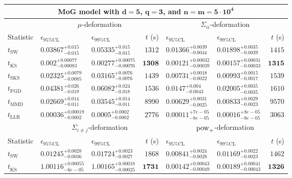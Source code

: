 \begin{tabular}{l|llr|llr}
	\toprule
	\multicolumn{7}{c}{{\bf MoG model with $\mathbf{d=5}$, $\mathbf{q=3}$, and $\mathbf{n=m=5\cdot 10^{4}}$}} \\
	\toprule
	\multicolumn{1}{c}{} & \multicolumn{3}{c}{$\mu$-deformation} & \multicolumn{3}{c}{$\Sigma_{ii}$-deformation} \\
	Statistic & $\epsilon_{95\%\mathrm{CL}}$ & $\epsilon_{99\%\mathrm{CL}}$ & $t$ (s) & $\epsilon_{95\%\mathrm{CL}}$ & $\epsilon_{99\%\mathrm{CL}}$ & $t$ (s) \\
	\midrule
	$t_{\mathrm{SW}}$ & $0.03867_{-0.015}^{+0.015}$ & $0.05335_{-0.015}^{+0.015}$ & $1312$ & $0.01366_{-0.0044}^{+0.0039}$ & $0.01898_{-0.0039}^{+0.0035}$ & $1415$ \\
	$t_{\overline{\mathrm{KS}}}$ & ${\mathbf{0.002_{-0.00083}^{+0.00077}}}$ & ${\mathbf{0.00277_{-0.00076}^{+0.00075}}}$ & ${\mathbf{1308}}$ & ${\mathbf{0.00121_{-0.00039}^{+0.00032}}}$ & ${\mathbf{0.00157_{-0.00033}^{+0.00031}}}$ & ${\mathbf{1315}}$ \\
	$t_{\mathrm{SKS}}$ & $0.02325_{-0.0085}^{+0.0079}$ & $0.03165_{-0.0076}^{+0.0076}$ & $1439$ & $0.00731_{-0.0022}^{+0.0018}$ & $0.00993_{-0.0017}^{+0.0015}$ & $1539$ \\
	$t_{\mathrm{FGD}}$ & $0.04381_{-0.019}^{+0.026}$ & $0.06082_{-0.018}^{+0.024}$ & $1536$ & $0.0147_{-0.0043}^{+0.004}$ & $0.02005_{-0.0035}^{+0.0035}$ & $1610$ \\
	$t_{\mathrm{MMD}}$ & $0.02669_{-0.011}^{+0.014}$ & $0.03545_{-0.011}^{+0.014}$ & $8990$ & $0.00629_{-0.0025}^{+0.0031}$ & $0.00833_{-0.0023}^{+0.0029}$ & $9570$ \\
	$t_{\mathrm{LLR}}$ & $0.00036_{-0.0002}^{+0.00019}$ & $0.0005_{-0.0002}^{+0.0002}$ & $2776$ & $0.00011_{-8e-05}^{+7e-05}$ & $0.00016_{-8e-05}^{+8e-05}$ & $3063$ \\
	\toprule
	\multicolumn{1}{c}{} & \multicolumn{3}{c}{$\Sigma_{i\neq j}$-deformation} & \multicolumn{3}{c}{$\rm{pow}_{+}$-deformation} \\
	Statistic & $\epsilon_{95\%\mathrm{CL}}$ & $\epsilon_{99\%\mathrm{CL}}$ & $t$ (s) & $\epsilon_{95\%\mathrm{CL}}$ & $\epsilon_{99\%\mathrm{CL}}$ & $t$ (s) \\
	\midrule
	$t_{\mathrm{SW}}$ & $0.01245_{-0.0036}^{+0.0028}$ & $0.01724_{-0.0027}^{+0.0023}$ & $1868$ & $0.00841_{-0.0028}^{+0.0024}$ & $0.01169_{-0.0023}^{+0.0022}$ & $1462$ \\
	$t_{\overline{\mathrm{KS}}}$ & $1.00116_{-6e-05}^{+0.00055}$ & $1.00165_{-0.00025}^{+0.00018}$ & ${\mathbf{1731}}$ & ${\mathbf{0.00142_{-0.00049}^{+0.00043}}}$ & ${\mathbf{0.00189_{-0.00043}^{+0.00041}}}$ & ${\mathbf{1326}}$ \\

\end{tabular}
